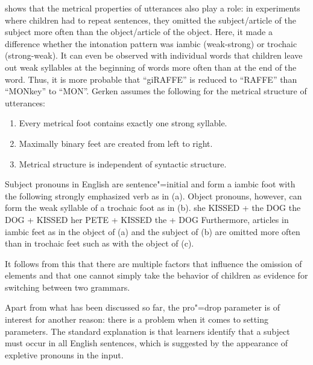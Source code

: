 \citet{Gerken91a} shows that the metrical properties of utterances also play a role: in experiments where children had to repeat sentences,
they omitted the subject/article of the subject more often  than the object/article of the object. Here, it made a difference whether the intonation pattern
was iambic (weak-strong) or trochaic (strong-weak). It can even be observed with individual words that children leave out
weak syllables at the beginning of words more often than at the end of the word. Thus, it is more probable that ``giRAFFE'' is reduced to ``RAFFE'' than
``MONkey'' to ``MON''. Gerken assumes the following for the metrical structure of utterances:
\begin{enumerate}
\item Every metrical foot contains exactly one strong syllable.
\item Maximally binary feet are created from left to right.
\item Metrical structure is independent of syntactic structure.
\end{enumerate}
Subject pronouns in English are sentence"=initial and form a iambic foot with the following strongly emphasized verb as in (a).
Object pronouns, however, can form the weak syllable of a trochaic foot as in (b). 
\eal
\ex she KISSED + the DOG
\ex the DOG + KISSED her
\ex PETE + KISSED the + DOG
\zl
Furthermore, articles in iambic feet as in the object of (a) and the subject of (b) are omitted more often
than in trochaic feet such as with the object of (c).

It follows from this that there are multiple factors that influence the omission of elements and that one cannot simply take the behavior
of children as evidence for switching between two grammars.

Apart from what has been discussed so far, the pro"=drop parameter is of interest for another reason: there is a problem when it comes to setting parameters. The standard explanation is
that learners identify that a subject must occur in all English sentences, which is suggested by the appearance of expletive pronouns in 
the input.

